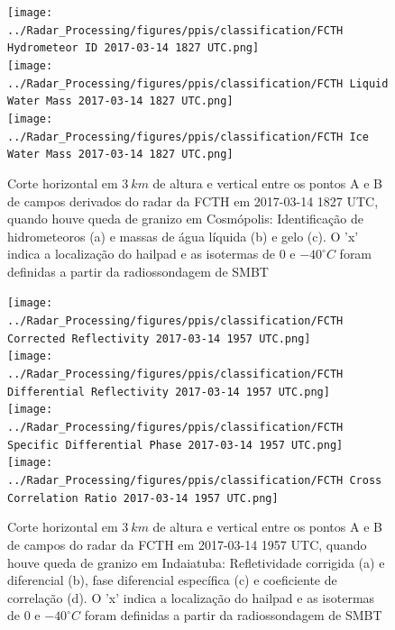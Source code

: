 \begin{figure}[htb]
	\centering
	\caption{Corte horizontal em $3\:km$ de altura e vertical entre os pontos A e B de campos derivados do radar da FCTH em 2017-03-14 1827 UTC, quando houve queda de granizo em Cosmópolis: Identificação de hidrometeoros (a) e massas de água líquida (b) e gelo (c). O 'x' indica a localização do hailpad e as isotermas de $0$ e $-40^{\circ}C$ foram definidas a partir da radiossondagem de SMBT} 
	\label{radar_derived_20170314_1}
	\vspace{-5pt}
	\texttt{[image: ../Radar\_Processing/figures/ppis/classification/FCTH Hydrometeor ID 2017-03-14 1827 UTC.png]}
		\label{hid_20170314_1} \\
	\vspace{-15pt}
	\texttt{[image: ../Radar\_Processing/figures/ppis/classification/FCTH Liquid Water Mass 2017-03-14 1827 UTC.png]}
		\label{ml_20170314_1} \\
	\vspace{-15pt}
	\texttt{[image: ../Radar\_Processing/figures/ppis/classification/FCTH Ice Water Mass 2017-03-14 1827 UTC.png]}
		\label{mi_20170314_1} \\
	\vspace{-5pt}
\end{figure}


\begin{figure}[hp]
	\centering
	\caption{Corte horizontal em $3\:km$ de altura e vertical entre os pontos A e B de campos do radar da FCTH em 2017-03-14 1957 UTC, quando houve queda de granizo em Indaiatuba: Refletividade corrigida (a) e diferencial (b), fase diferencial específica (c) e coeficiente de correlação (d). O 'x' indica a localização do hailpad e as isotermas de $0$ e $-40^{\circ}C$ foram definidas a partir da radiossondagem de SMBT}
	\label{radar_20170314_2}
	\vspace{-5pt}
	\texttt{[image: ../Radar\_Processing/figures/ppis/classification/FCTH Corrected Reflectivity 2017-03-14 1957 UTC.png]}
	\label{z_20170314_2} \\
	\vspace{-15pt}
	\texttt{[image: ../Radar\_Processing/figures/ppis/classification/FCTH Differential Reflectivity 2017-03-14 1957 UTC.png]}
	\label{zdr_20170314_2} \\
	\vspace{-15pt}
	\texttt{[image: ../Radar\_Processing/figures/ppis/classification/FCTH Specific Differential Phase 2017-03-14 1957 UTC.png]}
	\label{kdp_20170314_2} \\
	\vspace{-15pt}
	\texttt{[image: ../Radar\_Processing/figures/ppis/classification/FCTH Cross Correlation Ratio 2017-03-14 1957 UTC.png]}
	\label{rho_20170314_2} \\
	\vspace{-5pt}
\end{figure}

